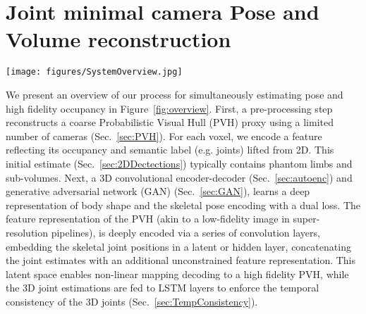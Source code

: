 \documentclass{bmvc2k}
\newcommand{\squeezeup}{\vspace{-2mm}}
\begin{document}
\section{Joint minimal camera Pose and Volume reconstruction}
\begin{figure*}[t!]
\centering
\texttt{[image: figures/SystemOverview.jpg]}
   \caption{Network architecture. The input is a low fidelity geometric proxy () from two wide baseline camera views. This proxy is passed through a decoder-encoder to produce a 3D human pose estimate (joint angles ) via the latent space and to output, a high-fidelity geometric proxy () regularised via discriminator (D).\label{fig:overview}
}
\end{figure*}
We present an overview of our process for simultaneously estimating pose and high fidelity occupancy in Figure~\ref{fig:overview}.  First, a pre-processing step~\cite{Grauman2003} reconstructs a coarse Probabilistic Visual Hull (PVH) proxy using a limited number of cameras (Sec.~\ref{sec:PVH}).  For each voxel, we encode a feature reflecting its occupancy and semantic label (e.g. joints) lifted from 2D.  This initial estimate (Sec.~\ref{sec:2DDectections}) typically contains phantom limbs and sub-volumes. Next, a 3D convolutional encoder-decoder (Sec.~\ref{sec:autoenc}) and generative adversarial network (GAN) (Sec.~\ref{sec:GAN}), learns a deep representation of body shape and the skeletal pose encoding with a dual loss. The feature representation of the PVH (akin to a low-fidelity image in super-resolution pipelines), is deeply encoded via a series of convolution layers, embedding the skeletal joint positions in a latent or hidden layer, concatenating the joint estimates with an additional unconstrained feature representation. This latent space enables non-linear mapping decoding to a high fidelity PVH, while the 3D joint estimations are fed to LSTM layers to enforce the temporal consistency of the 3D joints (Sec.~\ref{sec:TempConsistency}). 
\squeezeup
\squeezeup
\end{document}
